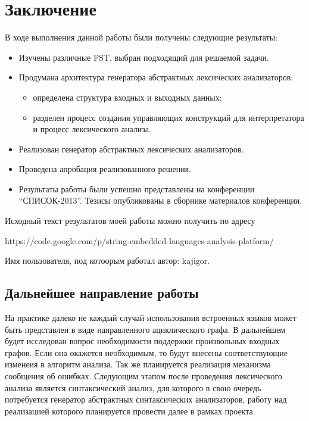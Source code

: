 \section*{Заключение}
В ходе выполнения данной работы были получены следующие результаты: 
\begin{itemize}
    \item Изучены различные FST, выбран подходящий для решаемой задачи.
    \item Продумана архитектура генератора абстрактных лексических анализаторов:
    \begin{itemize}
        \item определена структура входных и выходных данных;
        \item разделен процесс создания управляющих конструкций для 
        интерпретатора и процесс лексического анализа.
    \end{itemize}
    \item Реализован генератор абстрактных лексических анализаторов.
    \item Проведена апробация реализованного решения.
    \item Результаты работы были успешно представлены на конференции 
    “СПИСОК-2013”. Тезисы опубликованы в сборнике материалов конференции.
\end {itemize}

Исходный текст результатов моей работы можно получить по адресу 

https://code.google.com/p/string-embedded-languages-analysis-platform/

Имя пользователя, под котоорым работал автор: kajigor.

\subsection*{Дальнейшее направление работы}
На практике далеко не каждый случай использования встроенных языков может быть 
представлен в виде направленного ациклического графа.  В дальнейшем будет
исследован вопрос необходимости поддержки произвольных входных графов. Если
она окажется необходимым, то будут  внесены соответствующие изменеия в алгоритм
анализа. Так же планируется реализация 
механизма сообщения об ошибках. Следующим этапом после проведения лексического 
анализа является синтаксический анализ, для которого в свою очередь потребуется 
генератор абстрактных синтаксических анализаторов, работу над реализацией 
которого планируется провести далее в рамках проекта. 

